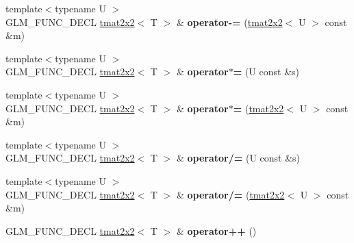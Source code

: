 \begin{DoxyCompactItemize}
\item 
\hypertarget{structglm_1_1detail_1_1tmat2x2_aa595ffa2296312bbb109af5c5701fd9d}{}{\footnotesize template$<$typename U $>$ }\\G\+L\+M\+\_\+\+F\+U\+N\+C\+\_\+\+D\+E\+C\+L \hyperlink{structglm_1_1detail_1_1tmat2x2}{tmat2x2}$<$ T $>$ \& {\bfseries operator-\/=} (\hyperlink{structglm_1_1detail_1_1tmat2x2}{tmat2x2}$<$ U $>$ const \&m)\label{structglm_1_1detail_1_1tmat2x2_aa595ffa2296312bbb109af5c5701fd9d}

\item 
\hypertarget{structglm_1_1detail_1_1tmat2x2_a33a00a31a0c777b09143cef2f1bd6a52}{}{\footnotesize template$<$typename U $>$ }\\G\+L\+M\+\_\+\+F\+U\+N\+C\+\_\+\+D\+E\+C\+L \hyperlink{structglm_1_1detail_1_1tmat2x2}{tmat2x2}$<$ T $>$ \& {\bfseries operator$\ast$=} (U const \&s)\label{structglm_1_1detail_1_1tmat2x2_a33a00a31a0c777b09143cef2f1bd6a52}

\item 
\hypertarget{structglm_1_1detail_1_1tmat2x2_a2c7a033623107e6feb21bb3b51913377}{}{\footnotesize template$<$typename U $>$ }\\G\+L\+M\+\_\+\+F\+U\+N\+C\+\_\+\+D\+E\+C\+L \hyperlink{structglm_1_1detail_1_1tmat2x2}{tmat2x2}$<$ T $>$ \& {\bfseries operator$\ast$=} (\hyperlink{structglm_1_1detail_1_1tmat2x2}{tmat2x2}$<$ U $>$ const \&m)\label{structglm_1_1detail_1_1tmat2x2_a2c7a033623107e6feb21bb3b51913377}

\item 
\hypertarget{structglm_1_1detail_1_1tmat2x2_a37c08f89d47be0279f96489239fb20f8}{}{\footnotesize template$<$typename U $>$ }\\G\+L\+M\+\_\+\+F\+U\+N\+C\+\_\+\+D\+E\+C\+L \hyperlink{structglm_1_1detail_1_1tmat2x2}{tmat2x2}$<$ T $>$ \& {\bfseries operator/=} (U const \&s)\label{structglm_1_1detail_1_1tmat2x2_a37c08f89d47be0279f96489239fb20f8}

\item 
\hypertarget{structglm_1_1detail_1_1tmat2x2_a9aab21954e48429c64d062331d01a486}{}{\footnotesize template$<$typename U $>$ }\\G\+L\+M\+\_\+\+F\+U\+N\+C\+\_\+\+D\+E\+C\+L \hyperlink{structglm_1_1detail_1_1tmat2x2}{tmat2x2}$<$ T $>$ \& {\bfseries operator/=} (\hyperlink{structglm_1_1detail_1_1tmat2x2}{tmat2x2}$<$ U $>$ const \&m)\label{structglm_1_1detail_1_1tmat2x2_a9aab21954e48429c64d062331d01a486}

\item 
\hypertarget{structglm_1_1detail_1_1tmat2x2_a04457c562f83f2f5d34bc5fa574faa17}{}G\+L\+M\+\_\+\+F\+U\+N\+C\+\_\+\+D\+E\+C\+L \hyperlink{structglm_1_1detail_1_1tmat2x2}{tmat2x2}$<$ T $>$ \& {\bfseries operator++} ()\label{structglm_1_1detail_1_1tmat2x2_a04457c562f83f2f5d34bc5fa574faa17}


\end{DoxyCompactItemize}
